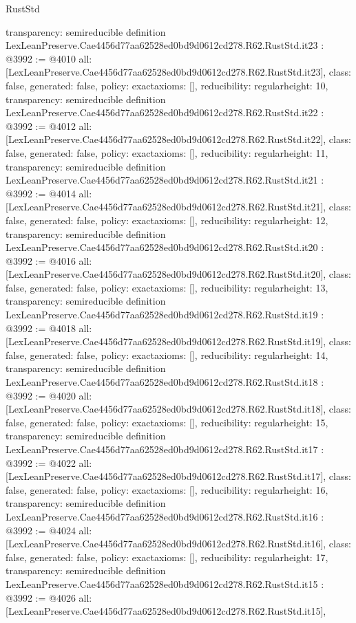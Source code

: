 \begin{lexlean}{RustStd}
\begin{coremodule}
{  transparency: semireducible
}
definition LexLeanPreserve.Cae4456d77aa62528ed0bd9d0612cd278.R62.RustStd.it23 : @3992 := @4010 {
  all: [LexLeanPreserve.Cae4456d77aa62528ed0bd9d0612cd278.R62.RustStd.it23],
  class: false,
  generated: false,
  policy: exact{axioms: []},
  reducibility: regular{height: 10},
  transparency: semireducible
}
definition LexLeanPreserve.Cae4456d77aa62528ed0bd9d0612cd278.R62.RustStd.it22 : @3992 := @4012 {
  all: [LexLeanPreserve.Cae4456d77aa62528ed0bd9d0612cd278.R62.RustStd.it22],
  class: false,
  generated: false,
  policy: exact{axioms: []},
  reducibility: regular{height: 11},
  transparency: semireducible
}
definition LexLeanPreserve.Cae4456d77aa62528ed0bd9d0612cd278.R62.RustStd.it21 : @3992 := @4014 {
  all: [LexLeanPreserve.Cae4456d77aa62528ed0bd9d0612cd278.R62.RustStd.it21],
  class: false,
  generated: false,
  policy: exact{axioms: []},
  reducibility: regular{height: 12},
  transparency: semireducible
}
definition LexLeanPreserve.Cae4456d77aa62528ed0bd9d0612cd278.R62.RustStd.it20 : @3992 := @4016 {
  all: [LexLeanPreserve.Cae4456d77aa62528ed0bd9d0612cd278.R62.RustStd.it20],
  class: false,
  generated: false,
  policy: exact{axioms: []},
  reducibility: regular{height: 13},
  transparency: semireducible
}
definition LexLeanPreserve.Cae4456d77aa62528ed0bd9d0612cd278.R62.RustStd.it19 : @3992 := @4018 {
  all: [LexLeanPreserve.Cae4456d77aa62528ed0bd9d0612cd278.R62.RustStd.it19],
  class: false,
  generated: false,
  policy: exact{axioms: []},
  reducibility: regular{height: 14},
  transparency: semireducible
}
definition LexLeanPreserve.Cae4456d77aa62528ed0bd9d0612cd278.R62.RustStd.it18 : @3992 := @4020 {
  all: [LexLeanPreserve.Cae4456d77aa62528ed0bd9d0612cd278.R62.RustStd.it18],
  class: false,
  generated: false,
  policy: exact{axioms: []},
  reducibility: regular{height: 15},
  transparency: semireducible
}
definition LexLeanPreserve.Cae4456d77aa62528ed0bd9d0612cd278.R62.RustStd.it17 : @3992 := @4022 {
  all: [LexLeanPreserve.Cae4456d77aa62528ed0bd9d0612cd278.R62.RustStd.it17],
  class: false,
  generated: false,
  policy: exact{axioms: []},
  reducibility: regular{height: 16},
  transparency: semireducible
}
definition LexLeanPreserve.Cae4456d77aa62528ed0bd9d0612cd278.R62.RustStd.it16 : @3992 := @4024 {
  all: [LexLeanPreserve.Cae4456d77aa62528ed0bd9d0612cd278.R62.RustStd.it16],
  class: false,
  generated: false,
  policy: exact{axioms: []},
  reducibility: regular{height: 17},
  transparency: semireducible
}
definition LexLeanPreserve.Cae4456d77aa62528ed0bd9d0612cd278.R62.RustStd.it15 : @3992 := @4026 {
  all: [LexLeanPreserve.Cae4456d77aa62528ed0bd9d0612cd278.R62.RustStd.it15],
}
\end{coremodule}
\end{lexlean}
